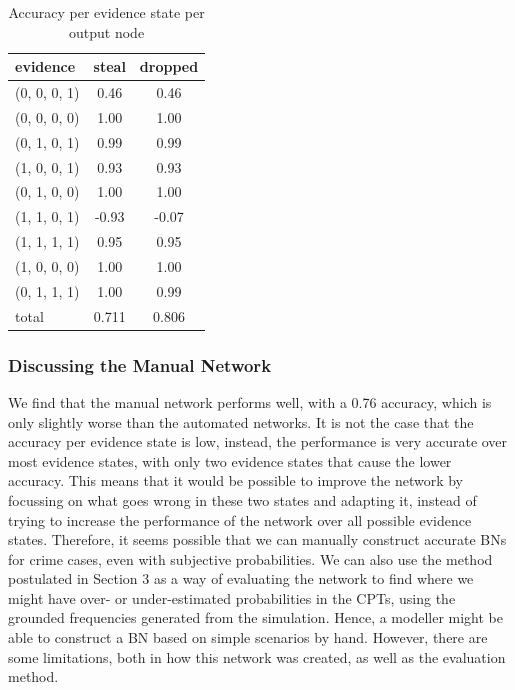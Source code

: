 \documentclass[12pt]{article}
\begin{document}
\begin{table}[htbp]
\begin{center}
\begin{tabular}{|l|c|c|}
\hline
evidence & steal & dropped  \\
\hline
(0, 0, 0, 1) & 0.46 & 0.46  \\
(0, 0, 0, 0) & 1.00 & 1.00 \\
(0, 1, 0, 1) & 0.99 & 0.99 \\
(1, 0, 0, 1) & 0.93 & 0.93 \\
(0, 1, 0, 0) & 1.00 & 1.00 \\
(1, 1, 0, 1) & -0.93 & -0.07\\
(1, 1, 1, 1) & 0.95 & 0.95\\
(1, 0, 0, 0) & 1.00 & 1.00 \\
(0, 1, 1, 1) & 1.00 & 0.99\\
\hline
total & 0.711 &  0.806  \\
\hline
\end{tabular}
\end{center}
\caption{Accuracy per evidence state per output node}
\label{now}
\end{table}

 \subsubsection{Discussing the Manual Network}
 
We find that the manual network performs well, with a 0.76 accuracy, which is only slightly worse than the automated networks. It is not the case that the accuracy per evidence state is low, instead, the performance is very accurate over most evidence states, with only two evidence states that cause the lower accuracy. This means that it would be possible to improve the network by focussing on what goes wrong in these two states and adapting it, instead of trying to increase the performance of the network over all possible evidence states. Therefore, it seems possible that we can manually construct accurate BNs for crime cases, even with subjective probabilities. We can also use the method postulated in Section 3 as a way of evaluating the network to find where we might have over- or under-estimated probabilities in the CPTs, using the grounded frequencies generated from the simulation. Hence, a modeller might be able to construct a BN based on simple scenarios by hand. However, there are some limitations, both in how this network was created, as well as the evaluation method.
\end{document}
